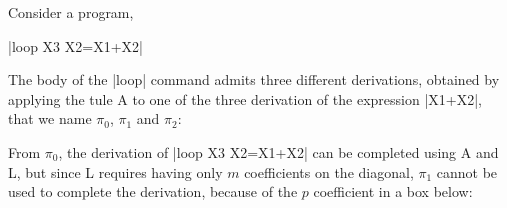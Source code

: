 \begin{example} \label{ex:partial}
Consider a program,
\begin{center}
\pr|loop X3 {X2=X1+X2}|
\end{center}
The body of the \pr|loop| command admits three different derivations,
obtained by applying the tule A to one of the three derivation of the expression
\pr|X1+X2|, that we name \(\pi_0\), \(\pi_1\) and \(\pi_2\):

\begin{center}
\hfill
{}
\hfill
{}
\end{center}

From \(\pi_0\), the derivation of  \pr|loop X3 {X2=X1+X2}| can be
completed using A and L, but since L requires having only \(m\) coefficients
on the diagonal, \(\pi_1\) cannot be used to complete the derivation,
because of the \(p\) coefficient in a box below:


\end{example}
